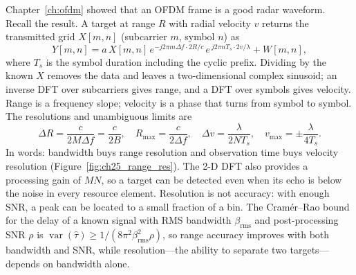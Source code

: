 Chapter~\ref{ch:ofdm} showed that an OFDM frame is a good radar waveform. Recall the result. A target
at range $R$ with radial velocity $v$ returns the transmitted grid $X[m,n]$ (subcarrier $m$, symbol
$n$) as
\begin{equation}
Y[m,n]=a\,X[m,n]\,e^{-j2\pi m\Delta f\cdot2R/c}\,e^{\,j2\pi nT_s\cdot2v/\lambda}+W[m,n],
\label{eq:ch25:ofdmradar}
\end{equation}
where $T_s$ is the symbol duration including the cyclic prefix. Dividing by the known $X$ removes the
data and leaves a two-dimensional complex sinusoid; an inverse DFT over subcarriers gives range, and a
DFT over symbols gives velocity. Range is a frequency slope; velocity is a phase that turns from symbol
to symbol. The resolutions and unambiguous limits are
\begin{equation}
\Delta R=\frac{c}{2M\Delta f}=\frac{c}{2B},\quad
R_{\max}=\frac{c}{2\Delta f},\quad
\Delta v=\frac{\lambda}{2NT_s},\quad
v_{\max}=\pm\frac{\lambda}{4T_s}.
\label{eq:ch25:radarres}
\end{equation}
In words: bandwidth buys range resolution and observation time buys velocity resolution
(Figure~\ref{fig:ch25_range_res}). The 2-D DFT also provides a processing gain of $MN$, so a target can
be detected even when its echo is below the noise in every resource element. Resolution is not
accuracy: with enough SNR, a peak can be located to a small fraction of a bin. The Cram\'er--Rao bound
for the delay of a known signal with RMS bandwidth $\beta_{\text{rms}}$ and post-processing SNR $\rho$
is $\operatorname{var}(\hat\tau)\ge1/(8\pi^2\beta_{\text{rms}}^2\rho)$, so range accuracy improves with
both bandwidth and SNR, while resolution---the ability to separate two targets---depends on bandwidth
alone.


